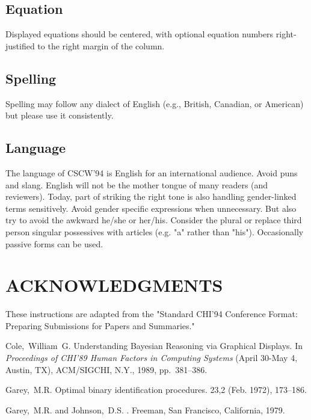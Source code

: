 \subsection{Equation}
Displayed equations should be centered, with optional equation
numbers right-justified to the right margin of the column.

\subsection{Spelling}
Spelling may follow any dialect of English (e.g., British, Canadian, or
American) but please use it consistently.

\subsection{Language}
The language of CSCW'94 is English for an international audience.
Avoid puns and  slang. English will not be the mother tongue of
many readers (and reviewers).  Today, part of striking the right tone
is also handling gender-linked terms sensitively.  Avoid gender
specific expressions when unnecessary.  \pagebreak But also try to avoid the
awkward he/she or her/his.  Consider the plural or replace third
person singular possessives with articles (e.g. "a" rather than "his").
Occasionally  passive forms can be used.

\section{ACKNOWLEDGMENTS}
These instructions are adapted from the "Standard CHI'94 Conference
Format: Preparing Submissions for Papers and Summaries."

\begin{thebibliography}{1}

Cole,~William~G.
\newblock Understanding Bayesian Reasoning via Graphical Displays.
\newblock In {\em Proceedings of CHI'89 Human Factors in Computing Systems\/}
  (April 30-May 4, Austin, TX), ACM/SIGCHI, N.Y., 1989, pp.~381--386.

Garey,~M.R.
\newblock Optimal binary identification procedures.
 23,2 (Feb. 1972), 173--186.

Garey,~M.R. and Johnson,~D.S.
.
\newblock Freeman, San Francisco, California, 1979.

\end{thebibliography}



